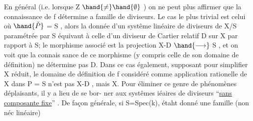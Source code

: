 En général (i.e.  lorsque Z $\hand{\neq}\hand{\emptyset}$ ) on ne peut plus affirmer que
la connaissance de f détermine a famille de diviseurs. Le cas le plus
trivial est celui où $\hand{\check{P}}$ = S , alors la donnée d'un systême linéaire de
diviseurs de X/S paramétrée par S équivaut à celle d'un diviseur de
Cartier relatif D sur X par rapport à S;  le morphisme
associé est la projection X-D $\hand{\longrightarrow}$ S , et on voit  que la connais
sance de ce morphisme (y compris celle de son domaine de définition)
ne détermine pas D. Dans ce cas également, supposant pour simplifier X
réduit, le domaine de définition de  f  considéré
comme application rationelle de X dans P = S n'est pas X-D , mais X.
Pour éliminer ce genre de phénomènes déplaisants, il y a lieu de se bor-%
ner aux systêmes iéaires de diviseurs ``\uline{sans composante fixe}'' . De
façon générale, si S=Spec(k), étaht donné une famille (non néc linéaire)

